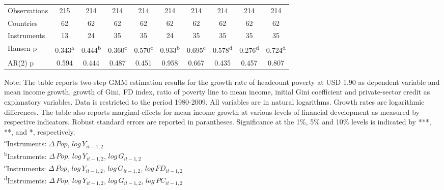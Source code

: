 \documentclass[12pt, a4paper]{article}
\begin{document}
\begin{table}
\begin{threeparttable}
{\begin{tabular}{l*{9}{c}}
				
				\hline
				Observations        &         215         &         214         &         214         &         214         &         214         &         214         &         214         &         214         &         214         \\
				Countries           &          62         &          62         &          62         &          62         &          62         &          62         &          62         &          62         &          62         \\
				Instruments         &          13         &          24         &          35         &          35         &          24         &          35         &          35         &          35         &          35         \\
				Hansen p         &       0.343\textsuperscript{a}         &       0.444\textsuperscript{b}         &       0.360\textsuperscript{c}         &       0.570\textsuperscript{c}         &       0.933\textsuperscript{b}         &       0.695\textsuperscript{c}         &       0.578\textsuperscript{d}         &       0.276\textsuperscript{d}         &       0.724\textsuperscript{d}         \\
				AR(2) p               &       0.594         &       0.444         &       0.487         &       0.451         &       0.958         &       0.667         &       0.435         &       0.457         &       0.807         \\
				\hline\hline
			\end{tabular}
		}
		\begin{tablenotes}
			\item \scriptsize{Note: The table reports two-step GMM estimation results for the growth rate of headcount poverty at USD 1.90 as dependent variable and mean income growth, growth of Gini, FD index, ratio of poverty line to mean income, initial Gini coefficient and private-sector credit as explanatory variables. Data is restricted to the period 1980-2009. All variables are in natural logarithms. Growth rates are logarithmic differences. The table also reports marginal effects for mean income growth at various levels of financial development as measured by respective indicators. Robust standard errors are reported in parantheses. Significance at the 1\%, 5\% and 10\% levels is indicated by ***, **, and *, respectively.\\
				\textsuperscript{a}Instruments: $\Delta \, Pop$, $log \, Y_{it-1,2}$}\\
			\textsuperscript{b}Instruments: $\Delta \, Pop$, $log \, Y_{it-1,2}$, $log \, G_{it-1,2}$\\
			\textsuperscript{c}Instruments: $\Delta \, Pop$, $log \, Y_{it-1,2}$, $log \, G_{it-1,2}$, $log \, FD_{it-1,2}$\\
			\textsuperscript{d}Instruments: $\Delta \, Pop$, $log \, Y_{it-1,2}$, $log \, G_{it-1,2}$, $log \, PC_{it-1,2}$\\
			

\end{tablenotes}
\end{threeparttable}
\end{table}
\end{document}
